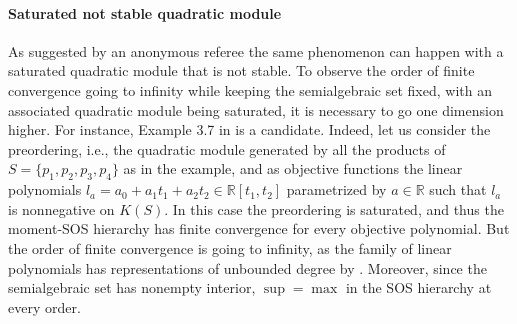 \documentclass[a4paper,12pt]{article}
\newcommand{\R}{\mathbb{R}} %
\begin{document}
{\paragraph{{Saturated not stable quadratic module}}
As suggested by an anonymous referee the same phenomenon can happen with a saturated quadratic module that is not stable.
To observe the order of finite convergence going to infinity while keeping the semialgebraic set fixed, with an associated quadratic module being saturated, it is necessary to go one dimension higher. 
For instance, Example 3.7 in \cite{netzer10} is a candidate.  
Indeed, let us consider the preordering, i.e., the quadratic module generated by all the products of $S=\{p_1, p_2, p_3, p_4\}$ as in the example, and as objective functions the linear polynomials  $l_a = a_0 + a_1 t_1 + a_2 t_2  \in \R[t_1, t_2]$ parametrized by $a \in \R$ such that $l_a$ is nonnegative on $K(S)$. 
In this case the preordering is saturated, and thus the moment-SOS hierarchy has finite convergence for every objective polynomial. 
But the order of finite convergence is going to infinity, as the family of linear polynomials has representations of unbounded degree by \cite[Theorem~3.5]{netzer10}. 
Moreover, since the semialgebraic set has nonempty interior, $\sup=\max$ in the SOS hierarchy at every order. 
}
%
\end{document}
